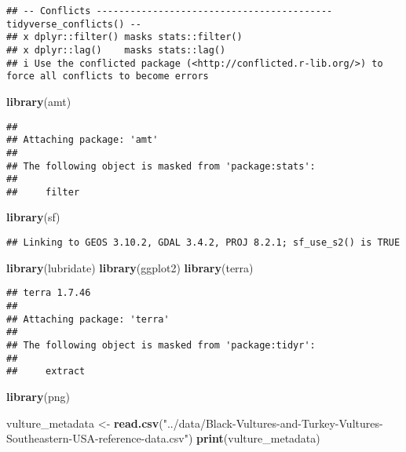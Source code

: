 \documentclass[
]{article}
\newenvironment{Shaded}{\begin{snugshade}}{\end{snugshade}}
\newcommand{\FunctionTok}[1]{\textcolor[rgb]{0.13,0.29,0.53}{\textbf{#1}}}
\newcommand{\NormalTok}[1]{#1}
\newcommand{\OtherTok}[1]{\textcolor[rgb]{0.56,0.35,0.01}{#1}}
\newcommand{\StringTok}[1]{\textcolor[rgb]{0.31,0.60,0.02}{#1}}
\begin{document}
\begin{verbatim}
## -- Conflicts ------------------------------------------ tidyverse_conflicts() --
## x dplyr::filter() masks stats::filter()
## x dplyr::lag()    masks stats::lag()
## i Use the conflicted package (<http://conflicted.r-lib.org/>) to force all conflicts to become errors
\end{verbatim}

\begin{Shaded}
\begin{Highlighting}[]
\FunctionTok{library}\NormalTok{(amt)}
\end{Highlighting}
\end{Shaded}

\begin{verbatim}
## 
## Attaching package: 'amt'
## 
## The following object is masked from 'package:stats':
## 
##     filter
\end{verbatim}

\begin{Shaded}
\begin{Highlighting}[]
\FunctionTok{library}\NormalTok{(sf)}
\end{Highlighting}
\end{Shaded}

\begin{verbatim}
## Linking to GEOS 3.10.2, GDAL 3.4.2, PROJ 8.2.1; sf_use_s2() is TRUE
\end{verbatim}

\begin{Shaded}
\begin{Highlighting}[]
\FunctionTok{library}\NormalTok{(lubridate) }
\FunctionTok{library}\NormalTok{(ggplot2)}
\FunctionTok{library}\NormalTok{(terra)}
\end{Highlighting}
\end{Shaded}

\begin{verbatim}
## terra 1.7.46
## 
## Attaching package: 'terra'
## 
## The following object is masked from 'package:tidyr':
## 
##     extract
\end{verbatim}

\begin{Shaded}
\begin{Highlighting}[]
\FunctionTok{library}\NormalTok{(png)}


\NormalTok{vulture\_metadata }\OtherTok{\textless{}{-}} \FunctionTok{read.csv}\NormalTok{(}\StringTok{"../data/Black{-}Vultures{-}and{-}Turkey{-}Vultures{-}Southeastern{-}USA{-}reference{-}data.csv"}\NormalTok{)}
\FunctionTok{print}\NormalTok{(vulture\_metadata)}
\end{Highlighting}
\end{Shaded}
\end{document}

